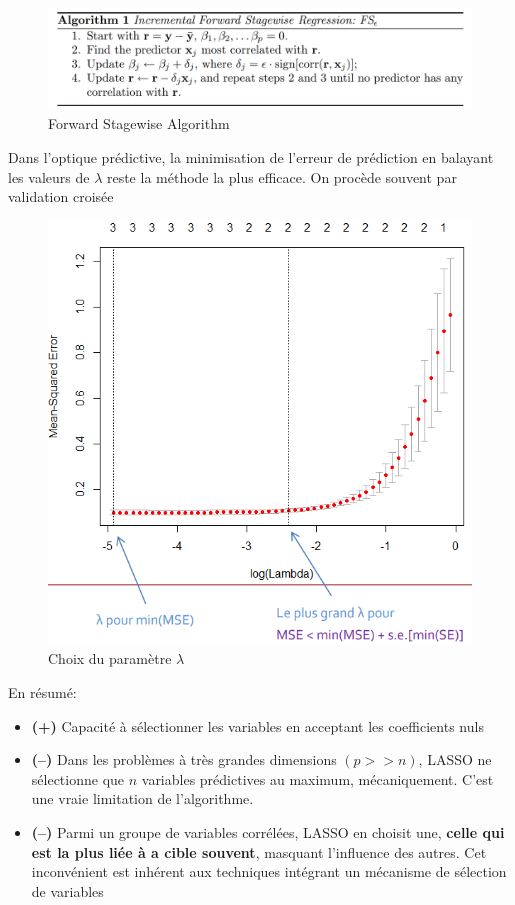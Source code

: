\documentclass[a4paper]{article}
\begin{document}
\begin{figure}[H]
    \centering
    \includegraphics[scale=0.4]{algo.png}
    \caption{Forward Stagewise Algorithm}
    \label{fig:enter-label}
\end{figure}

Dans l’optique prédictive, la minimisation de l’erreur de prédiction en balayant les valeurs de $\lambda$
reste la méthode la plus efficace. On procède souvent par validation croisée

\begin{figure}[H]
    \centering
    \includegraphics[scale=0.7]{lasso.png}
    \caption{Choix du paramètre $\lambda$}
    \label{fig:enter-label}
\end{figure}

En résumé:
\begin{itemize}
    \item \textbf{(+)} Capacité à sélectionner les variables en acceptant les coefficients nuls
    \item \textbf{(--)} Dans les problèmes à très grandes dimensions $(p >> n)$, LASSO ne sélectionne que $n$ variables prédictives au maximum, mécaniquement. C’est une vraie limitation de l’algorithme.
    \item \textbf{(--)} Parmi un groupe de variables corrélées, LASSO en choisit une, \textbf{celle qui est la plus liée à a cible souvent}, masquant l’influence des autres. Cet inconvénient est inhérent aux techniques intégrant un mécanisme de sélection de variables
\end{itemize}
\end{document}

